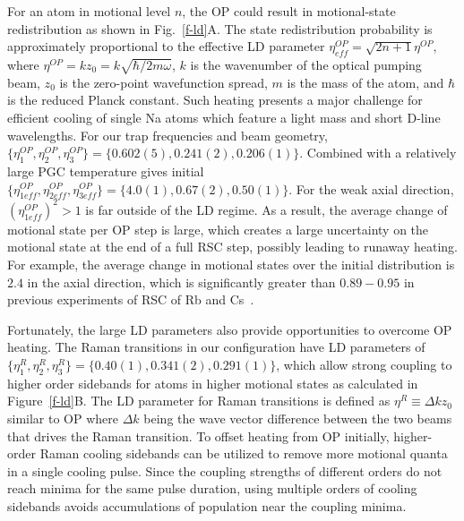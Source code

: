 \documentclass[aps,prl,twocolumn,groupedaddress]{revtex4-1}
\newcommand{\eff}{ef\! f}
\begin{document}
For an atom in motional level $n$, the OP could result in motional-state redistribution
as shown in Fig.~\ref{f-ld}A. The state redistribution probability
is approximately proportional to the effective LD parameter
$\eta^{OP}_{eff}=\sqrt{2n+1}\eta^{OP}$, where $\eta^{OP}=k z_0=k \sqrt{\hbar/2m\omega}$,
$k$ is the wavenumber of the optical pumping beam, $z_0$ is the zero-point wavefunction spread,
$m$ is the mass of the atom, and $\hbar$ is the reduced Planck constant.
Such heating presents a major challenge for efficient cooling of single Na atoms
which feature a light mass and short D-line wavelengths.
For our trap frequencies and beam geometry,
$\{\eta^{OP}_1,\eta^{OP}_2,\eta^{OP}_3\} = \{0.602(5), 0.241(2), 0.206(1)\}$.
Combined with a relatively large PGC temperature gives initial
$\{\eta^{OP}_{1\eff},\eta^{OP}_{2\eff},\eta^{OP}_{3\eff}\} = \{4.0(1), 0.67(2), 0.50(1)\}$.
For the weak axial direction, $(\eta^{OP}_{1\eff})^2>1$ is far outside of the LD regime.
As a result, the average change of motional state per OP step is large,
which creates a large uncertainty on the motional state at the end of a full RSC step, possibly leading to runaway heating.
For example, the average change in motional states over the initial distribution
is $2.4$ in the axial direction, which is significantly greater than $0.89-0.95$
in previous experiments of RSC of Rb and Cs~\cite{Li2012,Kaufman2012,Thompson2013,Liu2017}.

Fortunately, the large LD parameters also provide opportunities to overcome OP heating.
The Raman transitions in our configuration have LD parameters of
$\{\eta^R_{1},\eta^R_{2},\eta^R_{3}\} = \{0.40(1), 0.341(2), 0.291(1)\}$,
which allow strong coupling to higher order sidebands for atoms in higher motional states
as calculated in Figure~\ref{f-ld}B.
The LD parameter for Raman transitions is defined as $\eta^R\equiv\Delta k z_0$ similar to OP
where $\Delta k$ being the wave vector difference
between the two beams that drives the Raman transition.
To offset heating from OP initially, higher-order Raman cooling sidebands can be utilized
to remove more motional quanta in a single cooling pulse.
Since the coupling strengths of different orders do not reach minima for the same pulse duration,
using multiple orders of cooling sidebands avoids accumulations of population
near the coupling minima.
\end{document}
